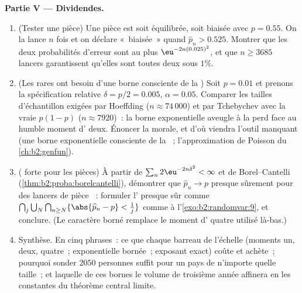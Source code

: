 \begin{problem}
\medskip
\noindent\textbf{Partie V --- Dividendes.}
\begin{enumerate}[resume]
  \item (Tester une pièce) Une pièce est soit équilibrée, soit biaisée avec
        $p = 0.55$. On la lance $n$ fois et on déclare
        «~biaisée~» quand $\widehat p_n > 0.525$. Montrer que
        les deux probabilités d'erreur sont au plus
        $\eu^{-2n(0.025)^2}$, et que $n \geq 3685$ lancers
        garantissent qu'elles sont toutes deux sous $1\%$.
  \item (Les  rares ont besoin d'une borne consciente de la ) Soit $p =
        0.01$ et prenons la spécification relative $\delta =
        p/2 = 0.005$, $\alpha = 0.05$. Comparer les tailles
        d'échantillon exigées par Hoeffding ($n \approx 74\,000$) et
        par Tchebychev avec la vraie  $p(1-p)$ ($n
        \approx 7920$)~: la borne exponentielle aveugle à la 
        perd face au humble moment d' deux. Énoncer la morale,
        et d'où viendra l'outil manquant (une borne exponentielle
        consciente de la ~; l'approximation de Poisson du
        \cref{ch:b2:genfun}).
  \item ( forte pour les pièces) À partir de $\sum_n
        2\eu^{-2n\delta^2} < \infty$ et de Borel--Cantelli
        (\cref{thm:b2:proba:borelcantelli}), démontrer que
        $\widehat p_n \to p$ presque sûrement pour des lancers de pièce
        ~: formuler l' presque sûr comme
        $\bigcap_j\bigcup_N\bigcap_{n\geq N}
        \{\abs{\widehat p_n - p} < \tfrac1j\}$ comme à
        l'\cref{exo:b2:randomvar:9}, et conclure. (Le caractère borné
        remplace le moment d' quatre utilisé là-bas.)
  \item Synthèse. En cinq phrases~: ce que chaque barreau de
        l'échelle (moments un, deux, quatre~; exponentielle bornée~;
        exposant exact) coûte et achète~; pourquoi sonder $2050$
        personnes suffit pour un pays de n'importe quelle taille~; et laquelle
        de ces bornes le volume de troisième année affinera en
        les constantes  du théorème central limite.
\end{enumerate}
\end{problem}
